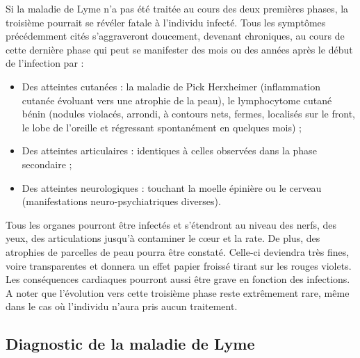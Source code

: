 \documentclass[12pt,a4wide]{article}
\begin{document}
Si la maladie de Lyme n'a pas été traitée au cours des deux premières phases, la
troisième pourrait  se révéler fatale  à l'individu infecté. Tous  les symptômes
précédemment  cités s'aggraveront  doucement, devenant  chroniques, au  cours de
cette dernière  phase qui  peut se manifester  des mois ou  des années  après le
début de l'infection par :

\begin{itemize}
\item Des  atteintes cutanées  :  la maladie  de  Pick Herxheimer  (inflammation
cutanée évoluant  vers une  atrophie de la  peau), le  lymphocytome cutané
bénin (nodules violacés,  arrondi, à contours nets,  fermes, localisés sur
le  front, le  lobe de  l'oreille et  régressant spontanément  en quelques
mois) ;

\item Des atteintes articulaires : identiques à celles observées dans la phase secondaire ;
\item Des atteintes neurologiques : touchant la moelle épinière ou le cerveau (manifestations neuro-psychiatriques diverses).
\end{itemize}

Tous les organes pourront être infectés et s'étendront au niveau des nerfs, des yeux, des articulations jusqu'à contaminer le cœur et la rate. De plus, des atrophies de parcelles de peau pourra être constaté. Celle-ci deviendra très fines, voire transparentes et donnera un effet papier froissé tirant sur les rouges violets. Les conséquences cardiaques pourront aussi être grave en fonction des infections.
A noter que l'évolution vers cette troisième phase reste extrêmement rare, même dans le cas où l'individu n'aura pris aucun traitement.


\subsection{Diagnostic de la maladie de Lyme}
\label{sec-3-4}
\end{document}
